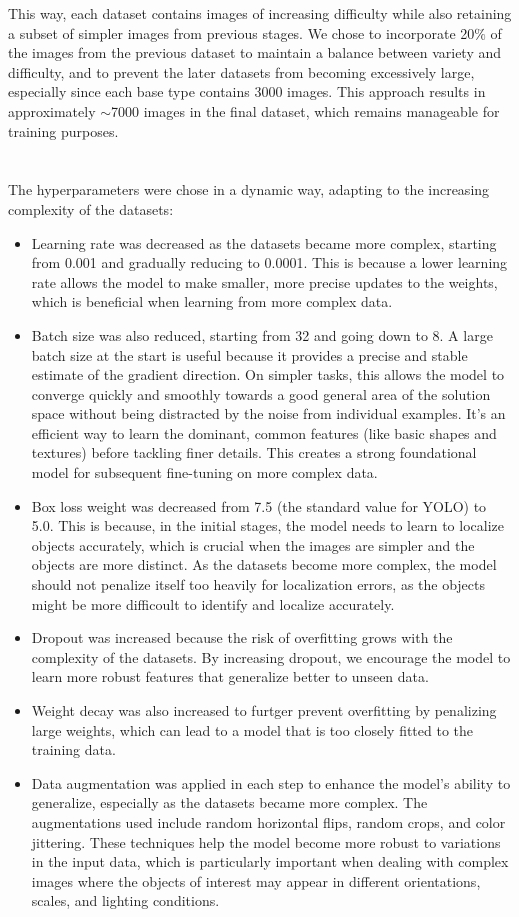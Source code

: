 This way, each dataset contains images of increasing difficulty while also retaining a subset of simpler images from previous stages.
We chose to incorporate 20$\%$ of the images from the previous dataset to maintain a balance between variety and difficulty, and to prevent the later datasets from becoming excessively large, especially since each base type contains 3000 images. This approach results in approximately $\sim$7000 images in the final dataset, which remains manageable for training purposes.
\\
\\
\\
The hyperparameters were chose in a dynamic way, adapting to the increasing complexity of the datasets:
\begin{itemize}
    \item Learning rate was decreased as the datasets became more complex, starting from 0.001 and gradually reducing to 0.0001. This is because a lower learning rate allows the model to make smaller, more precise updates to the weights, which is beneficial when learning from more complex data.
    \item Batch size was also reduced, starting from 32 and going down to 8. A large batch size at the start is useful because it provides a precise and stable estimate of the gradient direction. On simpler tasks, this allows the model to converge quickly and smoothly towards a good general area of the solution space without being distracted by the noise from individual examples. It's an efficient way to learn the dominant, common features (like basic shapes and textures) before tackling finer details. This creates a strong foundational model for subsequent fine-tuning on more complex data.
    \item Box loss weight was decreased from 7.5 (the standard value for YOLO) to 5.0. This is because, in the initial stages, the model needs to learn to localize objects accurately, which is crucial when the images are simpler and the objects are more distinct. As the datasets become more complex, the model should not penalize itself too heavily for localization errors, as the objects might be more difficoult to identify and localize accurately.
    \item Dropout was increased because the risk of overfitting grows with the complexity of the datasets. By increasing dropout, we encourage the model to learn more robust features that generalize better to unseen data. 
    \item Weight decay was also increased to furtger prevent overfitting by penalizing large weights, which can lead to a model that is too closely fitted to the training data.
    \item Data augmentation was applied in each step to enhance the model's ability to generalize, especially as the datasets became more complex. The augmentations used include random horizontal flips, random crops, and color jittering. These techniques help the model become more robust to variations in the input data, which is particularly important when dealing with complex images where the objects of interest may appear in different orientations, scales, and lighting conditions.
\end{itemize}

